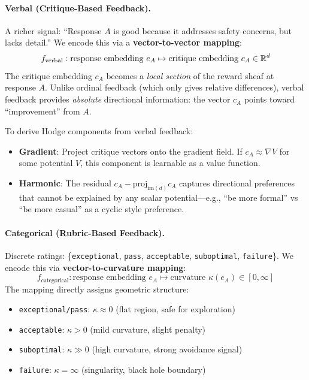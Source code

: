 \paragraph{Verbal (Critique-Based Feedback).}
A richer signal: ``Response $A$ is good because it addresses safety concerns, but lacks detail.'' We encode this via a \textbf{vector-to-vector mapping}:
\begin{equation}
f_{\text{verbal}}: \text{response embedding } e_A \mapsto \text{critique embedding } c_A \in \mathbb{R}^d
\end{equation}
The critique embedding $c_A$ becomes a \emph{local section} of the reward sheaf at response $A$. Unlike ordinal feedback (which only gives relative differences), verbal feedback provides \emph{absolute} directional information: the vector $c_A$ points toward ``improvement'' from $A$.

To derive Hodge components from verbal feedback:
\begin{itemize}
    \item \textbf{Gradient}: Project critique vectors onto the gradient field. If $c_A \approx \nabla V$ for some potential $V$, this component is learnable as a value function.
    \item \textbf{Harmonic}: The residual $c_A - \text{proj}_{\text{im}(d)} c_A$ captures directional preferences that cannot be explained by any scalar potential---e.g., ``be more formal'' vs ``be more casual'' as a cyclic style preference.
\end{itemize}

\paragraph{Categorical (Rubric-Based Feedback).}
Discrete ratings: \{\texttt{exceptional}, \texttt{pass}, \texttt{acceptable}, \texttt{suboptimal}, \texttt{failure}\}. We encode this via \textbf{vector-to-curvature mapping}:
\begin{equation}
f_{\text{categorical}}: \text{response embedding } e_A \mapsto \text{curvature } \kappa(e_A) \in [0, \infty]
\end{equation}
The mapping directly assigns geometric structure:
\begin{itemize}
    \item \texttt{exceptional/pass}: $\kappa \approx 0$ (flat region, safe for exploration)
    \item \texttt{acceptable}: $\kappa > 0$ (mild curvature, slight penalty)
    \item \texttt{suboptimal}: $\kappa \gg 0$ (high curvature, strong avoidance signal)
    \item \texttt{failure}: $\kappa = \infty$ (singularity, black hole boundary)
\end{itemize}


